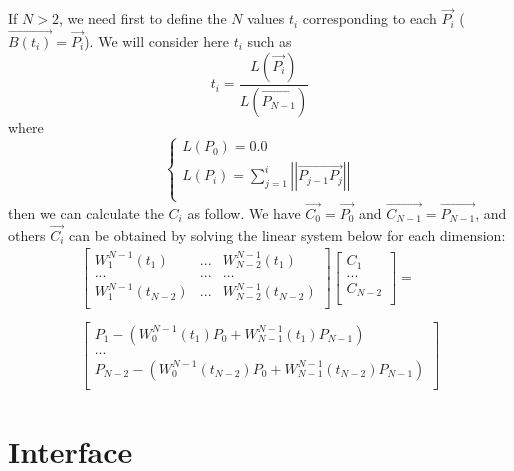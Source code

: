 \documentclass[12pt, a4paper]{article}
\begin{document}
If $N>2$, we need first to define the $N$ values $t_i$ corresponding to each $\overrightarrow{P_i}$ ($\overrightarrow{B(t_i)}=\overrightarrow{P_i}$). We will consider here $t_i$ such as\\
\begin{equation}
t_i=\frac{L(\overrightarrow{P_i})}{L(\overrightarrow{P_{N-1}})}
\end{equation}
where
\begin{equation}
\left\lbrace
\begin{array}{l}
L(P_0)=0.0\\
L(P_i)=\sum^i_{j=1}\left|\left|\overrightarrow{P_{j-1}P_j}\right|\right|\\
\end{array}
\right.
\end{equation}
then we can calculate the $C_i$ as follow. We have $\overrightarrow{C_0}=\overrightarrow{P_0}$ and $\overrightarrow{C_{N-1}}=\overrightarrow{P_{N-1}}$, and others $\overrightarrow{C_i}$ can be obtained by solving the linear system below for each dimension:\\
\begin{equation}
\begin{array}{c}
\left[
\begin{array}{ccc}
W^{N-1}_1(t_1)&...&W^{N-1}_{N-2}(t_1)\\
...&...&...\\
W^{N-1}_1(t_{N-2})&...&W^{N-1}_{N-2}(t_{N-2})\\
\end{array}
\right]\left[
\begin{array}{c}
C_1\\
...\\
C_{N-2}\\
\end{array}
\right]=\\
\\
\left[
\begin{array}{c}
P_1-\left(W^{N-1}_0(t_1)P_0+W^{N-1}_{N-1}(t_1)P_{N-1}\right)\\
...\\
P_{N-2}-\left(W^{N-1}_0(t_{N-2})P_0+W^{N-1}_{N-1}(t_{N-2})P_{N-1}\right)\\
\end{array}
\right]
\end{array}
\end{equation}

\section{Interface}
\end{document}
